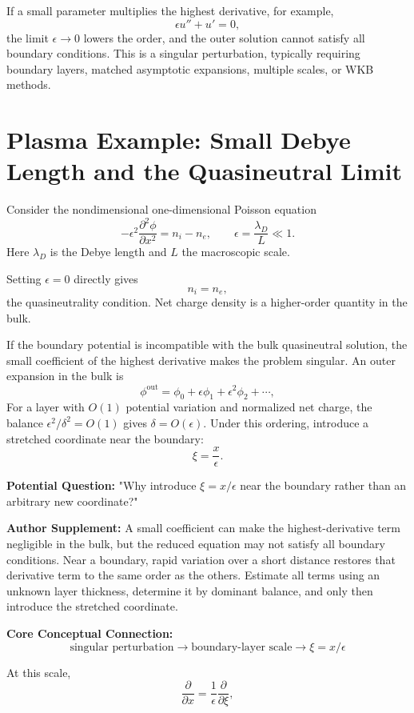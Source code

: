 If a small parameter multiplies the highest derivative, for example,
\[
\epsilon u''+u'=0,
\]
the limit \(\epsilon\to0\) lowers the order, and the outer solution cannot satisfy all boundary conditions. This is a singular perturbation, typically requiring boundary layers, matched asymptotic expansions, multiple scales, or WKB methods.

\section{Plasma Example: Small Debye Length and the Quasineutral Limit}

Consider the nondimensional one-dimensional Poisson equation
\[
-\epsilon^2\frac{\partial^2\phi}{\partial x^2}
=
n_i-n_e,
\qquad
\epsilon=\frac{\lambda_D}{L}\ll1.
\]
Here \(\lambda_D\) is the Debye length and \(L\) the macroscopic scale.

Setting \(\epsilon=0\) directly gives
\[
n_i=n_e,
\]
the quasineutrality condition. Net charge density is a higher-order quantity in the bulk.

If the boundary potential is incompatible with the bulk quasineutral solution, the small coefficient of the highest derivative makes the problem singular. An outer expansion in the bulk is
\[
\phi^{\mathrm{out}}
=
\phi_0+\epsilon\phi_1+\epsilon^2\phi_2+\cdots,
\]
For a layer with $O(1)$ potential variation and normalized net charge, the balance $\epsilon^2/\delta^2=O(1)$ gives $\delta=O(\epsilon)$. Under this ordering, introduce a stretched coordinate near the boundary:
\[
\xi=\frac{x}{\epsilon}.
\]

\begin{authornote}
\textbf{Potential Question:}
"Why introduce \(\xi=x/\epsilon\) near the boundary rather than an arbitrary new coordinate?"

\textbf{Author Supplement:}
A small coefficient can make the highest-derivative term negligible in the bulk, but the reduced equation may not satisfy all boundary conditions. Near a boundary, rapid variation over a short distance restores that derivative term to the same order as the others. Estimate all terms using an unknown layer thickness, determine it by dominant balance, and only then introduce the stretched coordinate.

\textbf{Core Conceptual Connection:}
\[
\text{singular perturbation}
\longrightarrow
\text{boundary-layer scale}
\longrightarrow
\xi=x/\epsilon
\]
\end{authornote}

At this scale,
\[
\frac{\partial}{\partial x}
=
\frac{1}{\epsilon}\frac{\partial}{\partial\xi},
\]

